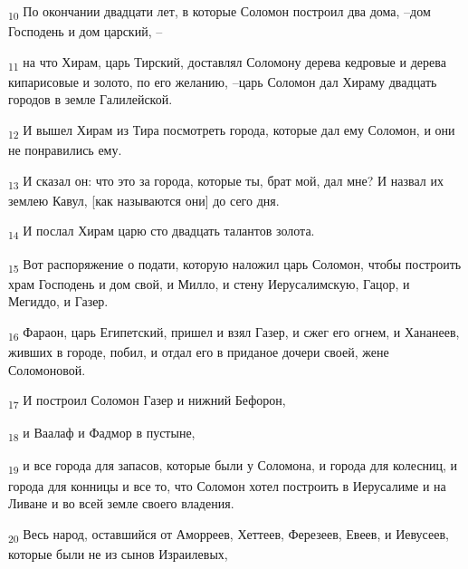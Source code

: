 \begin{tcolorbox}
\textsubscript{10} По окончании двадцати лет, в которые Соломон построил два дома, --дом Господень и дом царский, --
\end{tcolorbox}
\begin{tcolorbox}
\textsubscript{11} на что Хирам, царь Тирский, доставлял Соломону дерева кедровые и дерева кипарисовые и золото, по его желанию, --царь Соломон дал Хираму двадцать городов в земле Галилейской.
\end{tcolorbox}
\begin{tcolorbox}
\textsubscript{12} И вышел Хирам из Тира посмотреть города, которые дал ему Соломон, и они не понравились ему.
\end{tcolorbox}
\begin{tcolorbox}
\textsubscript{13} И сказал он: что это за города, которые ты, брат мой, дал мне? И назвал их землею Кавул, [как называются они] до сего дня.
\end{tcolorbox}
\begin{tcolorbox}
\textsubscript{14} И послал Хирам царю сто двадцать талантов золота.
\end{tcolorbox}
\begin{tcolorbox}
\textsubscript{15} Вот распоряжение о подати, которую наложил царь Соломон, чтобы построить храм Господень и дом свой, и Милло, и стену Иерусалимскую, Гацор, и Мегиддо, и Газер.
\end{tcolorbox}
\begin{tcolorbox}
\textsubscript{16} Фараон, царь Египетский, пришел и взял Газер, и сжег его огнем, и Хананеев, живших в городе, побил, и отдал его в приданое дочери своей, жене Соломоновой.
\end{tcolorbox}
\begin{tcolorbox}
\textsubscript{17} И построил Соломон Газер и нижний Бефорон,
\end{tcolorbox}
\begin{tcolorbox}
\textsubscript{18} и Ваалаф и Фадмор в пустыне,
\end{tcolorbox}
\begin{tcolorbox}
\textsubscript{19} и все города для запасов, которые были у Соломона, и города для колесниц, и города для конницы и все то, что Соломон хотел построить в Иерусалиме и на Ливане и во всей земле своего владения.
\end{tcolorbox}
\begin{tcolorbox}
\textsubscript{20} Весь народ, оставшийся от Аморреев, Хеттеев, Ферезеев, Евеев, и Иевусеев, которые были не из сынов Израилевых,
\end{tcolorbox}
